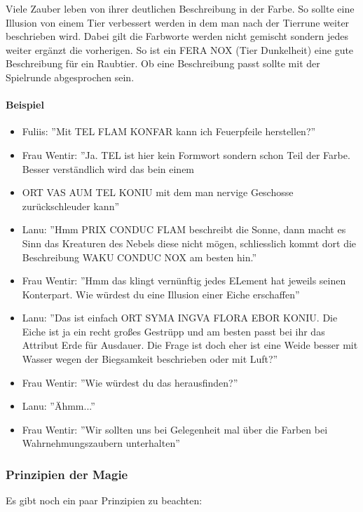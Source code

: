 \documentclass{article}
\begin{document}
Viele Zauber leben von ihrer deutlichen Beschreibung in der Farbe. So sollte eine Illusion von einem Tier verbessert
werden in dem man nach der Tierrune weiter beschrieben wird. Dabei gilt die Farbworte werden nicht gemischt sondern
jedes weiter ergänzt die vorherigen. So ist ein FERA NOX (Tier Dunkelheit) eine gute Beschreibung für ein Raubtier.
Ob eine Beschreibung passt sollte mit der Spielrunde abgesprochen sein.

\paragraph{Beispiel}

\begin{itemize}
\item Fuliis: ''Mit TEL FLAM KONFAR kann ich Feuerpfeile herstellen?''
\item Frau Wentir: ''Ja. TEL ist hier kein Formwort sondern schon Teil der Farbe. Besser verständlich wird das bein einem 
\item ORT VAS AUM TEL KONIU mit dem man nervige Geschosse zurückschleuder kann''
\item Lanu: ''Hmm PRIX CONDUC FLAM beschreibt die Sonne, dann macht es Sinn das Kreaturen des Nebels diese nicht mögen, schliesslich kommt dort die Beschreibung WAKU CONDUC NOX am besten hin.''
\item Frau Wentir: ''Hmm das klingt vernünftig jedes ELement hat jeweils seinen Konterpart. Wie würdest du eine Illusion einer Eiche erschaffen''
\item Lanu: ''Das ist einfach ORT SYMA INGVA FLORA EBOR KONIU. Die Eiche ist ja ein recht großes Gestrüpp und am besten passt bei ihr das Attribut Erde für Ausdauer. Die Frage ist doch eher ist eine Weide besser mit Wasser wegen der Biegsamkeit beschrieben oder mit Luft?''
\item Frau Wentir: ''Wie würdest du das herausfinden?''
\item Lanu: ''Ähmm...''
\item Frau Wentir: ''Wir sollten uns bei Gelegenheit mal über die Farben bei Wahrnehmungszaubern unterhalten''
\end{itemize}

\subsubsection{Prinzipien der Magie}

Es gibt noch ein paar Prinzipien zu beachten:
\end{document}
